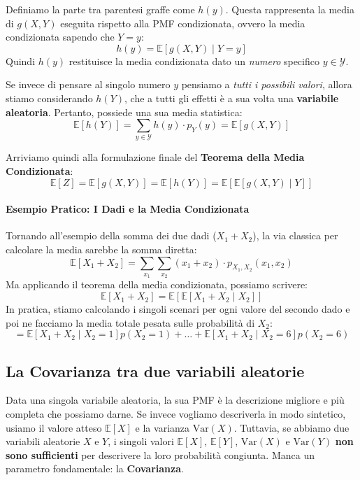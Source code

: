 Definiamo la parte tra parentesi graffe come $h(y)$. Questa rappresenta la media di $g(X,Y)$ eseguita rispetto alla PMF condizionata, ovvero la media condizionata sapendo che $Y=y$:
\begin{equation}
    h(y) = \mathbb{E}[g(X,Y) \mid Y=y]
\end{equation}
Quindi $h(y)$ restituisce la media condizionata dato un \textit{numero} specifico $y \in \mathcal{Y}$. 

Se invece di pensare al singolo numero $y$ pensiamo a \textit{tutti i possibili valori}, allora stiamo considerando $h(Y)$, che a tutti gli effetti è a sua volta una \textbf{variabile aleatoria}. Pertanto, possiede una sua media statistica:
\[
\mathbb{E}[h(Y)] = \sum_{y \in \mathcal{Y}} h(y) \cdot p_Y(y) = \mathbb{E}[g(X,Y)]
\]

Arriviamo quindi alla formulazione finale del \textbf{Teorema della Media Condizionata}:
\begin{equation}
    \boxed{\mathbb{E}[Z] = \mathbb{E}[g(X,Y)] = \mathbb{E}[h(Y)] = \mathbb{E}[\mathbb{E}[g(X,Y) \mid Y]]}
\end{equation}

\paragraph{Esempio Pratico: I Dadi e la Media Condizionata}
Tornando all'esempio della somma dei due dadi ($X_1 + X_2$), la via classica per calcolare la media sarebbe la somma diretta:
\[
\mathbb{E}[X_1 + X_2] = \sum_{x_1} \sum_{x_2} (x_1+x_2) \cdot p_{X_1, X_2}(x_1, x_2)
\]
Ma applicando il teorema della media condizionata, possiamo scrivere:
\[
\mathbb{E}[X_1+X_2] = \mathbb{E}[\mathbb{E}[X_1+X_2 \mid X_2]]
\]
In pratica, stiamo calcolando i singoli scenari per ogni valore del secondo dado e poi ne facciamo la media totale pesata sulle probabilità di $X_2$:
\[
= \mathbb{E}[X_1+X_2 \mid X_2=1]p(X_2=1) + \dots + \mathbb{E}[X_1+X_2 \mid X_2=6]p(X_2=6)
\]

\subsection{La Covarianza tra due variabili aleatorie}

Data una singola variabile aleatoria, la sua PMF è la descrizione migliore e più completa che possiamo darne. Se invece vogliamo descriverla in modo sintetico, usiamo il valore atteso $\mathbb{E}[X]$ e la varianza $\text{Var}(X)$. 
Tuttavia, se abbiamo due variabili aleatorie $X$ e $Y$, i singoli valori $\mathbb{E}[X]$, $\mathbb{E}[Y]$, $\text{Var}(X)$ e $\text{Var}(Y)$ \textbf{non sono sufficienti} per descrivere la loro probabilità congiunta. Manca un parametro fondamentale: la \textbf{Covarianza}.

